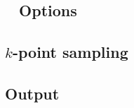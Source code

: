

\subsection{\texorpdfstring{\tsiesta\ }{TranSIESTA} Options}



\subsection{\texorpdfstring{$k$}{k}-point sampling}



\subsection{Output}


